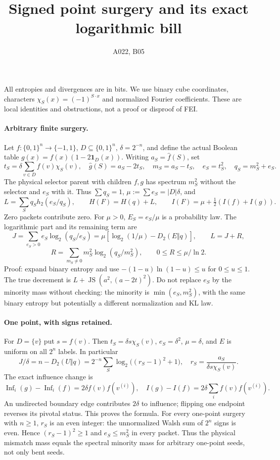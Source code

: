 \documentclass{article}
\begin{document}
\title{Signed point surgery and its exact logarithmic bill}
\author{A022, B05}\maketitle
All entropies and divergences are in bits. We use binary cube coordinates,
characters $\chi_S(x)=(-1)^{S\cdot x}$ and normalized Fourier coefficients.
These are local identities and obstructions, not a proof or disproof of FEI.

\paragraph{Arbitrary finite surgery.}
Let $f:\{0,1\}^n\to\{-1,1\}$, $D\subseteq\{0,1\}^n$,
$\delta=2^{-n}$, and define the actual Boolean table
$g(x)=f(x)(1-2\mathbf1_D(x))$.
Writing $a_S=\widehat f(S)$, set
\[
t_S=\delta\sum_{v\in D}f(v)\chi_S(v),\quad
\widehat g(S)=a_S-2t_S,\quad
m_S=a_S-t_S,\quad e_S=t_S^2,\quad q_S=m_S^2+e_S.
\]
The physical selector parent with children $f,g$ has spectrum
$m_S^2$ without the selector and $e_S$ with it. Thus
$\sum q_S=1$, $\mu:=\sum e_S=|D|\delta$, and
\[
L=\sum_S q_Sh_2(e_S/q_S),\qquad
H(F)=H(q)+L,\qquad
I(F)=\mu+\tfrac12(I(f)+I(g)).
\]
Zero packets contribute zero. For $\mu>0$, $E_S=e_S/\mu$ is a
probability law. The logarithmic part and its remaining term are
\[
J=\sum_{e_S>0}e_S\log_2(q_S/e_S)
=\mu[\log_2(1/\mu)-D_2(E\Vert q)],
\qquad L=J+R,
\]
\[
R=\sum_{m_S\ne0}m_S^2\log_2(q_S/m_S^2),
\qquad 0\le R\le\mu/\ln2.
\]
Proof: expand binary entropy and use
$-(1-u)\ln(1-u)\le u$ for $0\le u\le1$.
The true decrement is $L+\operatorname{JS}(a^2,(a-2t)^2)$.
Do not replace $e_S$ by the minority mass without checking:
the minority is $\min(e_S,m_S^2)$, with the same binary entropy
but potentially a different normalization and KL law.

\paragraph{One point, with signs retained.}
For $D=\{v\}$ put $s=f(v)$. Then
$t_S=\delta s\chi_S(v)$, $e_S=\delta^2$, $\mu=\delta$,
and $E$ is uniform on all $2^n$ labels. In particular
\[
J/\delta=n-D_2(U\Vert q)
=2^{-n}\sum_S\log_2\big((r_S-1)^2+1\big),\quad
r_S=\frac{a_S}{\delta s\chi_S(v)}.
\]
The exact influence change is
\[
\operatorname{Inf}_i(g)-\operatorname{Inf}_i(f)
=2\delta f(v)f(v^{(i)}),\quad
I(g)-I(f)=2\delta\sum_i f(v)f(v^{(i)}).
\]
An undirected boundary edge contributes $2\delta$ to influence;
flipping one endpoint reverses its pivotal status. This proves the formula.
For every one-point surgery with $n\ge1$, $r_S$ is an even integer:
the unnormalized Walsh sum of $2^n$ signs is even. Hence
$(r_S-1)^2\ge1$ and $e_S\le m_S^2$ in every packet.
Thus the physical mismatch mass equals the spectral minority mass
for arbitrary one-point seeds, not only bent seeds.
\end{document}
